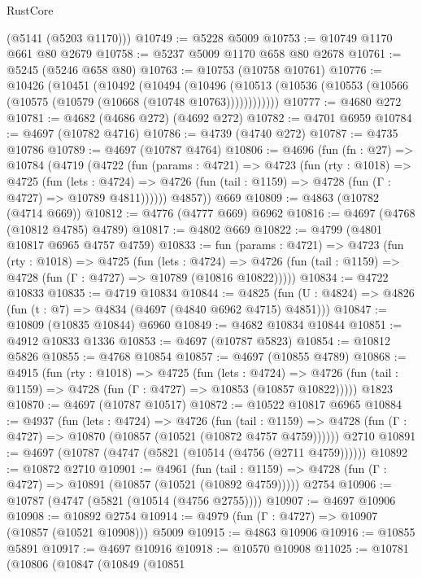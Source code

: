 \begin{lexlean}{RustCore}
\begin{coremodule}
      (@5141 (@5203 @1170)))
@10749 := @5228 @5009
@10753 := @10749 @1170 @661 @80 @2679
@10758 := @5237 @5009 @1170 @658 @80 @2678
@10761 := @5245 (@5246 @658 @80)
@10763 := @10753 (@10758 @10761)
@10776 := @10426
    (@10451
      (@10492
        (@10494
          (@10496 (@10513 (@10536 (@10553 (@10566 (@10575 (@10579 (@10668 (@10748 @10763))))))))))))
@10777 := @4680 @272
@10781 := @4682 (@4686 @272) (@4692 @272)
@10782 := @4701 @6959
@10784 := @4697 (@10782 @4716)
@10786 := @4739 (@4740 @272)
@10787 := @4735 @10786
@10789 := @4697 (@10787 @4764)
@10806 := @4696
    (fun (fn : @27) =>
    @10784
      (@4719
        (@4722
          (fun (params : @4721) =>
          @4723
            (fun (rty : @1018) =>
            @4725
              (fun (lets : @4724) =>
              @4726 (fun (tail : @1159) => @4728 (fun (Γ : @4727) => @10789 @4811))))))
        @4857))
    @669
@10809 := @4863 (@10782 (@4714 @669))
@10812 := @4776 (@4777 @669) @6962
@10816 := @4697 (@4768 (@10812 @4785) @4789)
@10817 := @4802 @669
@10822 := @4799 (@4801 @10817 @6965 @4757 @4759)
@10833 := fun (params : @4721) =>
  @4723
    (fun (rty : @1018) =>
    @4725
      (fun (lets : @4724) =>
      @4726 (fun (tail : @1159) => @4728 (fun (Γ : @4727) => @10789 (@10816 @10822)))))
@10834 := @4722 @10833
@10835 := @4719 @10834
@10844 := @4825 (fun (U : @4824) => @4826 (fun (t : @7) => @4834 (@4697 (@4840 @6962 @4715) @4851)))
@10847 := @10809 (@10835 @10844) @6960
@10849 := @4682 @10834 @10844
@10851 := @4912 @10833 @1336
@10853 := @4697 (@10787 @5823)
@10854 := @10812 @5826
@10855 := @4768 @10854
@10857 := @4697 (@10855 @4789)
@10868 := @4915
    (fun (rty : @1018) =>
    @4725
      (fun (lets : @4724) =>
      @4726 (fun (tail : @1159) => @4728 (fun (Γ : @4727) => @10853 (@10857 @10822)))))
    @1823
@10870 := @4697 (@10787 @10517)
@10872 := @10522 @10817 @6965
@10884 := @4937
    (fun (lets : @4724) =>
    @4726
      (fun (tail : @1159) =>
      @4728 (fun (Γ : @4727) => @10870 (@10857 (@10521 (@10872 @4757 @4759))))))
    @2710
@10891 := @4697 (@10787 (@4747 (@5821 (@10514 (@4756 (@2711 @4759))))))
@10892 := @10872 @2710
@10901 := @4961
    (fun (tail : @1159) => @4728 (fun (Γ : @4727) => @10891 (@10857 (@10521 (@10892 @4759)))))
    @2754
@10906 := @10787 (@4747 (@5821 (@10514 (@4756 @2755))))
@10907 := @4697 @10906
@10908 := @10892 @2754
@10914 := @4979 (fun (Γ : @4727) => @10907 (@10857 (@10521 @10908))) @5009
@10915 := @4863 @10906
@10916 := @10855 @5891
@10917 := @4697 @10916
@10918 := @10570 @10908
@11025 := @10781
    (@10806
      (@10847
        (@10849
          (@10851

\end{coremodule}
\end{lexlean}

